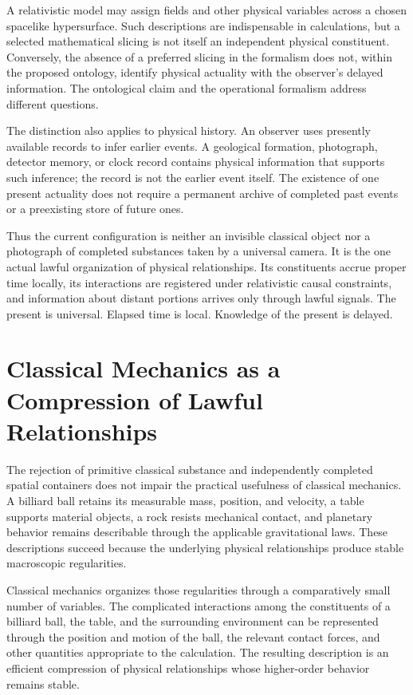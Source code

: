 \documentclass[12pt,onecolumn]{article}
\begin{document}
A relativistic model may assign fields and other physical variables across a chosen spacelike hypersurface. Such descriptions are indispensable in calculations, but a selected mathematical slicing is not itself an independent physical constituent. Conversely, the absence of a preferred slicing in the formalism does not, within the proposed ontology, identify physical actuality with the observer's delayed information. The ontological claim and the operational formalism address different questions.

The distinction also applies to physical history. An observer uses presently available records to infer earlier events. A geological formation, photograph, detector memory, or clock record contains physical information that supports such inference; the record is not the earlier event itself. The existence of one present actuality does not require a permanent archive of completed past events or a preexisting store of future ones.

Thus the current configuration is neither an invisible classical object nor a photograph of completed substances taken by a universal camera. It is the one actual lawful organization of physical relationships. Its constituents accrue proper time locally, its interactions are registered under relativistic causal constraints, and information about distant portions arrives only through lawful signals. The present is universal. Elapsed time is local. Knowledge of the present is delayed.

\section{Classical Mechanics as a Compression of Lawful Relationships}

The rejection of primitive classical substance and independently completed spatial containers does not impair the practical usefulness of classical mechanics. A billiard ball retains its measurable mass, position, and velocity, a table supports material objects, a rock resists mechanical contact, and planetary behavior remains describable through the applicable gravitational laws. These descriptions succeed because the underlying physical relationships produce stable macroscopic regularities.

Classical mechanics organizes those regularities through a comparatively small number of variables. The complicated interactions among the constituents of a billiard ball, the table, and the surrounding environment can be represented through the position and motion of the ball, the relevant contact forces, and other quantities appropriate to the calculation. The resulting description is an efficient compression of physical relationships whose higher-order behavior remains stable.
\end{document}
